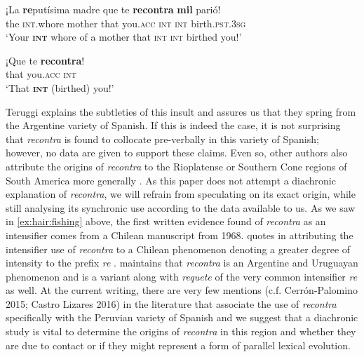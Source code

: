 \documentclass[output=paper,colorlinks,citecolor=brown,
]{langscibook}
\begin{document}
\begin{exe}
\ex\label{ex:hair:whore}
\gll ¡La \textbf{re}putísima madre que te \textbf{recontra} \textbf{mil} parió! \\
the \textsc{int}.whore mother that you.\textsc{acc} \textsc{int} \textsc{int} birth.\textsc{pst.3sg}\\
\glt `Your \textbf{\textsc{int}} whore of a mother that \textsc{int} \textsc{int} birthed you!' \citep[78]{Teruggi1981}
\end{exe}

\begin{exe}
\ex\label{ex:hair:birth}
\gll ¡Que te \textbf{recontra}! \\
that you.\textsc{acc} \textsc{int}\\
\glt `That \textbf{\textsc{int}} (birthed) you!' \citep[78]{Teruggi1981}\\
\end{exe}

Teruggi explains the subtleties of this insult and assures us that they spring from the Argentine variety of Spanish. If this is indeed the case, it is not surprising that \textit{recontra} is found to collocate pre-verbally in this variety of Spanish; however, no data are given to support these claims. Even so, other authors also attribute the origins of \textit{recontra} to the Rioplatense or Southern Cone regions of South America more generally \citep{Rabanales1958,kornfeld2012cuantificacion,resnik2012gramaticalizacion}. As this paper does not attempt a diachronic explanation of \textit{recontra}, we will refrain from speculating on its exact origin, while still analysing its synchronic use according to the data available to us. As we saw in \ref{ex:hair:fishing} above, the first written evidence found of \textit{recontra} as an intensifier comes from a Chilean manuscript from 1968. \citet{martin1998prefijos} quotes \citet{Rabanales1958} in attributing the intensifier use of \textit{recontra} to a Chilean phenomenon denoting a greater degree of intensity to the prefix \textit{re} \citep[113]{martin1998prefijos}. \citet[73]{kornfeld2012cuantificacion} maintains that \textit{recontra} is an Argentine and Uruguayan phenomenon and is a variant along with \textit{requete} of the very common intensifier \textit{re} as well. At the current writing, there are very few mentions (c.f. Cerrón-Palomino 2015; Castro Lizares 2016) in the literature that associate the use of \textit{recontra} specifically with the Peruvian variety of Spanish and we suggest that a diachronic study is vital to determine the origins of \textit{recontra} in this region and whether they are due to contact or if they might represent a form of parallel lexical evolution. 
\end{document}
